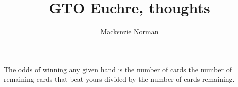 \documentclass{article}
\title{GTO Euchre, thoughts}
\author{Mackenzie Norman}
\begin{document}
\maketitle
The odds of winning any given hand is the number of cards the number of remaining cards that beat yours divided by the number of cards remaining.
\end{document}
